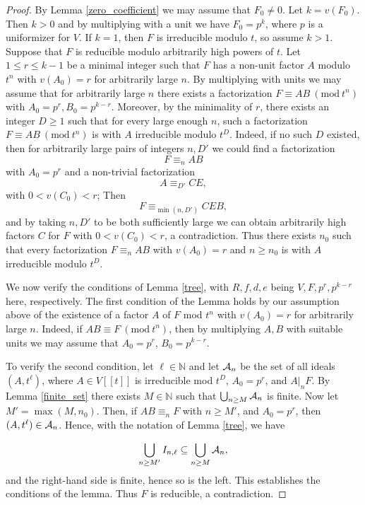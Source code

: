 \documentclass{article}
\newcommand{\N}{\mathbb{N}}
\newcommand{\Mod}[1]{\ (\mathrm{mod}\ #1)}
\theoremstyle{plain}
\theoremstyle{definition}
\theoremstyle{remark}
\theoremstyle{plain}
\begin{document}
\begin{proof}
    By Lemma \ref{zero_coefficient} we may assume that $F_0 \neq 0$. Let $k = v(F_0)$. Then $k > 0$ and by multiplying with a unit we have $F_0 = p^k$, where $p$ is a uniformizer for $V$. If $k = 1$, then $F$ is irreducible modulo $t$, so assume $k > 1$.
    Suppose that $F$ is reducible modulo arbitrarily high powers of $t$. Let $1 \leq r \leq k-1$ be a minimal integer such that $F$ has a non-unit factor $A$ modulo $t^n$ with $v(A_0) = r$ for arbitrarily large $n$.     
    By multiplying with units we may assume that for arbitrarily large $n$ there exists a factorization $F \equiv AB \Mod{t^n}$ with $A_0 = p^r, B_0 = p^{k-r}$. Moreover, by the minimality of $r$, there exists an integer $D \geq 1$ such that for every large enough $n$, such a factorization $F \equiv AB \Mod{t^n}$ is with $A$ irreducible modulo $t^D$. Indeed, if no such $D$ existed, then for arbitrarily large pairs of integers $n,D'$ we could find a factorization $$F \equiv_n  AB$$ with $A_0 = p^r$ and a non-trivial factorization $$A \equiv_{ D'} CE,$$
    with $0<v(C_0) < r$; Then $$F \equiv_{\min(n, D')} CEB,$$
and by taking $n,D'$ to be both sufficiently large we can obtain arbitrarily high factors $C$ for $F$ with $0<v(C_0) < r$, a contradiction. Thus there exists $n_0$ such that every factorization $F \equiv_n AB$ with $v(A_0) = r$ and $n \geq n_0$ is with $A$ irreducible modulo $t^D$.

We now verify the conditions of Lemma \ref{tree}, with $R,f,d,e$ being $V,F,p^r,p^{k-r}$ here, respectively. The first condition of the Lemma holds by our assumption above of the existence of a factor $A$ of $F$ mod $t^n$ with $v(A_0) = r$ for arbitrarily large $n$. Indeed, if $AB \equiv F \Mod{t^n}$, then by multiplying $A,B$ with suitable units we may assume that $A_0 = p^r$, $B_0 = p^{k-r}$.

To verify the second condition, let $\ell \in \N$ and let ${\cal{A}}_{n}$ be the set of all ideals $(A,t^\ell)$, where $A \in V[[t]]$ is irreducible mod $t^D$, $A_0 = p^r$, and $A|_nF$. By Lemma \ref{finite_set} there exists $M \in \N$ such that $\bigcup_{n\geq M}{\cal{A}}_{n}$ is finite. Now let $M' = \max(M,n_0)$. Then, if $AB \equiv_n F$ with $n \geq M'$, and $A_0 = p^r$, then $(A,t^\ell) \in {\cal{A}}_n$. Hence, with the notation of Lemma \ref{tree}, we have

$$\bigcup_{n \geq M'} I_{n,\ell} \subseteq \bigcup_{n \geq M} {\cal{A}}_n,$$
and the right-hand side is finite, hence so is the left. This establishes the conditions of the lemma. Thus $F$ is reducible, a contradiction.
   
\end{proof}
\end{document}
